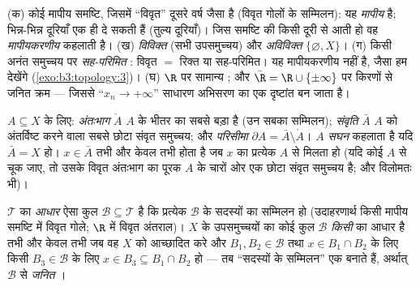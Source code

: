 \begin{example}\label{ex:b3:topology:examples}
(क) कोई मापीय समष्टि, जिसमें ``विवृत'' दूसरे वर्ष जैसा है (विवृत
गोलों के सम्मिलन): यह \emph{मापीय } है; भिन्न-भिन्न
दूरियाँ एक ही  दे सकती हैं (तुल्य दूरियाँ)। जिस समष्टि की
 किसी दूरी से आती हो वह \emph{मापीयकरणीय} कहलाती है।
(ख) \emph{विविक्त}  (सभी उपसमुच्चय) और \emph{अविविक्त}
 $\{\varnothing, X\}$।
(ग) किसी अनंत समुच्चय पर \emph{सह-परिमित} : विवृत $=$
रिक्त या सह-परिमित। यह मापीयकरणीय नहीं है, जैसा हम देखेंगे
(\cref{exo:b3:topology:3})।
(घ) $\R$ पर सामान्य ; और $\bar\R = \R \cup
\{\pm\infty\}$ पर किरणों से जनित क्रम
 --- जिससे ``$x_n \to +\infty$'' साधारण अभिसरण का एक दृष्टांत बन जाता
है।
\end{example}

\begin{definition}\label{def:b3:topology:interior}
$A \subseteq X$ के लिए: \emph{अंतःभाग} $\mathring A$ $A$ के भीतर का सबसे बड़ा  है (उन सबका सम्मिलन); \emph{संवृति} $\bar A$
$A$ को अंतर्विष्ट करने वाला सबसे छोटा संवृत समुच्चय; और
\emph{परिसीमा} $\partial A = \bar A
\setminus \mathring A$। $A$ \emph{सघन} कहलाता
है यदि $\bar A = X$ हो। $x \in \bar A$ तभी और केवल तभी होता है जब $x$ का प्रत्येक
 $A$ से मिलता हो (यदि कोई  $A$ से चूक जाए, तो
उसके विवृत अंतःभाग का पूरक $A$ के चारों ओर एक छोटा संवृत समुच्चय
है; और विलोमतः भी)।
\end{definition}

\begin{definition}\label{def:b3:topology:basis}
$\mathcal T$ का \emph{आधार} ऐसा कुल $\mathcal B \subseteq \mathcal T$ है कि
प्रत्येक  $\mathcal B$ के सदस्यों का सम्मिलन हो (उदाहरणार्थ
किसी मापीय समष्टि में विवृत गोले; $\R$ में विवृत अंतराल)। $X$ के
उपसमुच्चयों का कोई कुल $\mathcal B$ \emph{किसी}  का आधार है तभी
और केवल तभी जब वह $X$ को आच्छादित करे और $B_1, B_2 \in \mathcal B$ तथा $x \in B_1 \cap B_2$ के लिए
किसी $B_3 \in \mathcal B$ के लिए $x \in B_3 \subseteq B_1\cap B_2$ हो --- तब ``सदस्यों के सम्मिलन'' एक
 बनाते हैं, अर्थात् $\mathcal B$ से \emph{जनित} ।
\end{definition}

